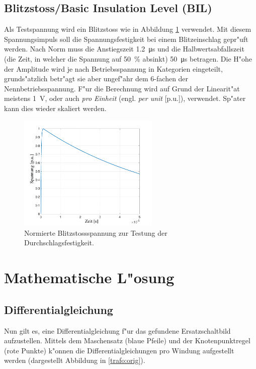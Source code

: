 \begin{refsection}
\subsection{Blitzstoss/\textbf{B}asic \textbf{I}nsulation \textbf{L}evel (BIL)}
Als Testspannung wird ein Blitzstoss wie in Abbildung \ref{trafo:BIL} verwendet. Mit diesem Spannungsimpuls soll die Spannungsfestigkeit bei einem Blitzeinschlag gepr"uft werden. Nach Norm muss die Anstiegszeit \SI{1.2}{\micro \second} und die Halbwertsabfallszeit (die Zeit, in welcher die Spannung auf \SI{50}{\percent} absinkt) \SI{50}{\micro \second} betragen. Die H"ohe der Amplitude wird je nach Betriebsspannung in Kategorien eingeteilt, grunds"atzlich betr"agt sie aber ungef"ahr dem 6-fachen der Nennbetriebsspannung. F"ur die Berechnung wird auf Grund der Linearit"at meistens \SI{1}{\volt}, oder auch \textit{pro Einheit} (engl. \textit{per unit} [p.u.]), verwendet. Sp"ater kann dies wieder skaliert werden.

\begin{figure}
	\centering
	\includegraphics[width=0.6\textwidth]{./trafo/images/pulse.pdf}
	\caption{Normierte Blitzstossspannung zur Testung der Durchschlagsfestigkeit.}
	\label{trafo:BIL}
\end{figure}

\section{Mathematische L"osung}
\subsection{Differentialgleichung}

Nun gilt es, eine Differentialgleichung f"ur das gefundene Ersatzschaltbild aufzustellen. Mittels dem Maschensatz (blaue Pfeile) und der Knotenpunktregel (rote Punkte) k"onnen die Differentialgleichungen pro Windung aufgestellt werden (dargestellt Abbildung in \ref{trafo:orig}).


\end{refsection}
